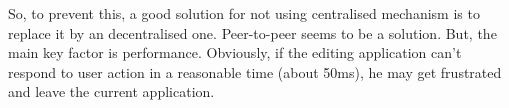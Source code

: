 So, to prevent this, a good solution for not using centralised mechanism is to replace it by an decentralised one. Peer-to-peer seems to be a solution. But, the main key factor is performance. Obviously, if the editing application can't respond to user action in a reasonable time (about 50ms), he may get frustrated and leave the current application.
